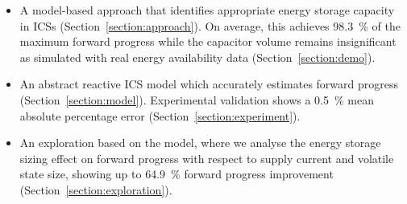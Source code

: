 \begin{itemize}
    \item A model-based approach that identifies appropriate energy storage capacity in ICSs (Section~\ref{section:approach}). On average, this achieves \SI{98.3}{\percent} of the maximum forward progress while the capacitor volume remains insignificant as simulated with real energy availability data (Section~\ref{section:demo}). 
    \item An abstract reactive ICS model which accurately estimates forward progress (Section~\ref{section:model}). Experimental validation shows a \SI{0.5}{\percent} mean absolute percentage error (Section~\ref{section:experiment}).
    \item An exploration based on the model, where we analyse the energy storage sizing effect on forward progress with respect to supply current and volatile state size, showing up to \SI{64.9}{\percent} forward progress improvement (Section~\ref{section:exploration}). 


    

\end{itemize}
\color{black}


